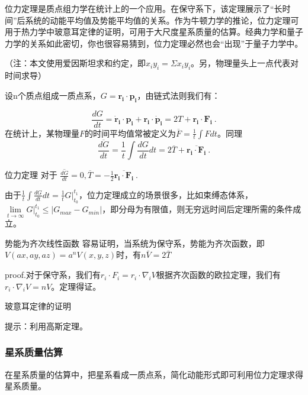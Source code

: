 

位力定理是质点组力学在统计上的一个应用。在保守系下，该定理展示了“长时间”后系统的动能平均值及势能平均值的关系。作为牛顿力学的推论，位力定理可用于热力学中玻意耳定律的证明，可用于大尺度星系质量的估算。经典力学和量子力学的关系如此密切，你也很容易猜到，位力定理必然也会“出现”于量子力学中。

（注：本文使用爱因斯坦求和约定，即$x_iy_i=\Sigma x_iy_i$。另，物理量头上一点代表对时间求导）

设n个质点组成一质点系，$G=\boldsymbol{r_i\cdot p_i}$，由链式法则我们有：

\begin{equation}
\frac{dG}{dt}=\boldsymbol{\dot{r}_i\cdot p_i}+\boldsymbol{r_i\cdot\dot{p}_i}=2T+\boldsymbol{r_i\cdot F_i}~.
\end{equation}
在统计上，某物理量$F$的时间平均值常被定义为$\overline{F}=\frac{1}{t}\int Fdt $。同理
\begin{equation}
\overline{\frac{dG}{dt}}=\frac{1}{t}\int \frac{dG}{dt}dt=2\overline{ T}+\overline{\boldsymbol{r_i\cdot F_i}}~.
\end{equation}

\begin{theorem}{位力定理}
对于 $\overline{\frac{dG}{dt}}=0,
\overline{ T}=-\frac{1}{2}\overline{\boldsymbol{r_i\cdot F_i}}~.$
\end{theorem}
由于$\frac{1}{t}\int \frac{dG}{dt}dt=\frac{1}{t}G\big|_{t_0}^{t_1}$，位力定理成立的场景很多，比如束缚态体系，$\lim \limits_{t \to \infty}G\big|_{t_0}^{t_1}\leq \left|{G_{max}-G_{min}}\right|$，即分母为有限值，则无穷远时间后定理所需的条件成立。
\begin{corollary}{势能为齐次线性函数}
容易证明，当系统为保守系，势能为齐次函数，即$V(ax,ay,az)=a^nV(x,y,z)$时，有$n\bar{V}=2\bar{T}$
\end{corollary}
proof.对于保守系，我们有$r_i\cdot F_i=r_i\cdot \nabla_i V$根据齐次函数的欧拉定理，我们有$r_i\cdot \nabla_i V=n V$。定理得证。
\begin{exercise}{玻意耳定律的证明}
\end{exercise}
提示：利用高斯定理。
\subsubsection{星系质量估算}  
在星系质量的估算中，把星系看成一质点系，简化动能形式即可利用位力定理求得星系质量。